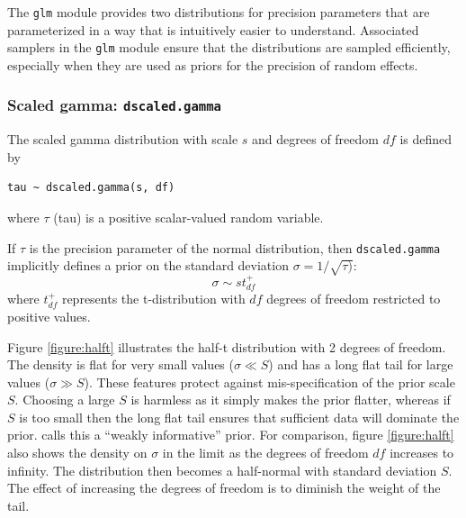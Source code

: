 \documentclass[11pt, a4paper, titlepage]{report}
\begin{document}
The \texttt{glm} module provides two distributions for precision
parameters that are parameterized in a way that is intuitively easier
to understand. Associated samplers in the \texttt{glm} module ensure
that the distributions are sampled efficiently, especially when they
are used as priors for the precision of random effects.

\subsubsection{Scaled gamma: \texttt{dscaled.gamma}}

The scaled gamma distribution with scale $s$ and degrees of freedom $df$
is defined by
\begin{verbatim}
tau ~ dscaled.gamma(s, df)
\end{verbatim}
where $\tau$ (tau) is a positive scalar-valued random variable.

If $\tau$ is the precision parameter of the normal distribution, then
\texttt{dscaled.gamma} implicitly defines a prior on the standard
deviation $\sigma = 1/\sqrt{\tau)}$:
\[
\sigma \sim s t_{df}^{+}
\]
where $t_{df}^{+}$ represents the t-distribution with $df$ degrees of
freedom restricted to positive values.

Figure \ref{figure:halft} illustrates the half-t distribution with 2
degrees of freedom. The density is flat for very small values ($\sigma
\ll S$) and has a long flat tail for large values ($\sigma \gg
S$). These features protect against mis-specification of the prior
scale $S$.  Choosing a large $S$ is harmless as it simply makes the
prior flatter, whereas if $S$ is too small then the long flat tail
ensures that sufficient data will dominate the
prior. \citet{Gelman2006} calls this a ``weakly informative''
prior. For comparison, figure \ref{figure:halft} also shows the
density on $\sigma$ in the limit as the degrees of freedom $df$
increases to infinity. The distribution then becomes a half-normal
with standard deviation $S$. The effect of increasing the degrees of
freedom is to diminish the weight of the tail.
\end{document}
